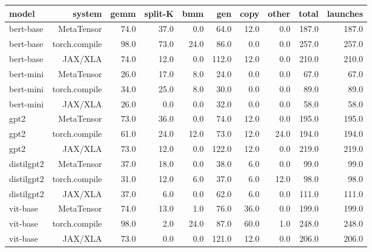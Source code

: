 \begin{tabular}{lrrrrrrrrr}
\toprule
model & system & gemm & split-K & bmm & gen & copy & other & total & launches \\
\midrule
bert-base & MetaTensor & 74.0 & 37.0 & 0.0 & 64.0 & 12.0 & 0.0 & 187.0 & 187.0 \\
bert-base & torch.compile & 98.0 & 73.0 & 24.0 & 86.0 & 0.0 & 0.0 & 257.0 & 257.0 \\
bert-base & JAX/XLA & 74.0 & 12.0 & 0.0 & 112.0 & 12.0 & 0.0 & 210.0 & 210.0 \\
bert-mini & MetaTensor & 26.0 & 17.0 & 8.0 & 24.0 & 0.0 & 0.0 & 67.0 & 67.0 \\
bert-mini & torch.compile & 34.0 & 25.0 & 8.0 & 30.0 & 0.0 & 0.0 & 89.0 & 89.0 \\
bert-mini & JAX/XLA & 26.0 & 0.0 & 0.0 & 32.0 & 0.0 & 0.0 & 58.0 & 58.0 \\
gpt2 & MetaTensor & 73.0 & 36.0 & 0.0 & 74.0 & 12.0 & 0.0 & 195.0 & 195.0 \\
gpt2 & torch.compile & 61.0 & 24.0 & 12.0 & 73.0 & 12.0 & 24.0 & 194.0 & 194.0 \\
gpt2 & JAX/XLA & 73.0 & 12.0 & 0.0 & 122.0 & 12.0 & 0.0 & 219.0 & 219.0 \\
distilgpt2 & MetaTensor & 37.0 & 18.0 & 0.0 & 38.0 & 6.0 & 0.0 & 99.0 & 99.0 \\
distilgpt2 & torch.compile & 31.0 & 12.0 & 6.0 & 37.0 & 6.0 & 12.0 & 98.0 & 98.0 \\
distilgpt2 & JAX/XLA & 37.0 & 6.0 & 0.0 & 62.0 & 6.0 & 0.0 & 111.0 & 111.0 \\
vit-base & MetaTensor & 74.0 & 13.0 & 1.0 & 76.0 & 36.0 & 0.0 & 199.0 & 199.0 \\
vit-base & torch.compile & 98.0 & 2.0 & 24.0 & 87.0 & 60.0 & 1.0 & 248.0 & 248.0 \\
vit-base & JAX/XLA & 73.0 & 0.0 & 0.0 & 121.0 & 12.0 & 0.0 & 206.0 & 206.0 \\
\bottomrule
\end{tabular}
